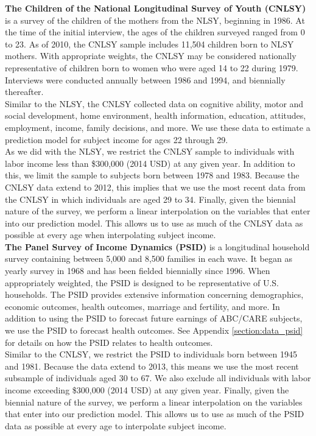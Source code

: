 \noindent \textbf{The Children of the National Longitudinal Survey of Youth (CNLSY)} is a survey of the children of the mothers from the NLSY, beginning in 1986. At the time of the initial interview, the ages of the children surveyed ranged from 0 to 23. As of 2010, the CNLSY sample includes 11,504 children born to NLSY mothers. With appropriate weights, the CNLSY may be considered nationally representative of children born to women who were aged 14 to 22 during 1979. Interviews were conducted annually between 1986 and 1994, and biennially thereafter. \\

\noindent Similar to the NLSY, the CNLSY collected data on cognitive ability, motor and social development, home environment, health information, education, attitudes, employment, income, family decisions, and more. We use these data to estimate a prediction model for subject income for ages 22 through 29. \\

\noindent As we did with the NLSY, we restrict the CNLSY sample to individuals with labor income less than \$300,000 (2014 USD) at any given year. In addition to this, we limit the sample to subjects born between 1978 and 1983. Because the CNLSY data extend to 2012, this implies that we use the most recent data from the CNLSY in which individuals are aged 29 to 34. Finally, given the biennial nature of the survey, we perform a linear interpolation on the variables that enter into our prediction model. This allows us to use as much of the CNLSY data as possible at every age when interpolating subject income. \\

\noindent \textbf{The Panel Survey of Income Dynamics (PSID)} is a longitudinal household survey containing between 5,000 and 8,500 families in each wave. It began as yearly survey in 1968 and has been fielded biennially since 1996. When appropriately weighted, the PSID is designed to be representative of U.S. households. The PSID provides extensive information concerning demographics, economic outcomes, health outcomes, marriage and fertility, and more. In addition to using the PSID to forecast future earnings of ABC/CARE subjects, we use the PSID to forecast health outcomes. See Appendix \ref{section:data_psid} for details on how the PSID relates to health outcomes. \\

\noindent Similar to the CNLSY, we restrict the PSID to individuals born between 1945 and 1981. Because the data extend to 2013, this means we use the most recent subsample of individuals aged 30 to 67. We also exclude all individuals with labor income exceeding \$300,000 (2014 USD) at any given year. Finally, given the biennial nature of the survey, we perform a linear interpolation on the variables that enter into our prediction model. This allows us to use as much of the PSID data as possible at every age to interpolate subject income. \\

